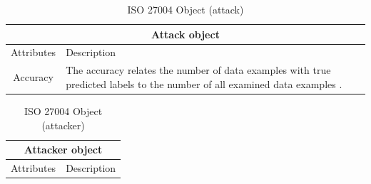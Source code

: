 \begin{table}[h]
\centering
  \begin{tabular}{|c|p{10cm}|}
  \hline
  \multicolumn{2}{|c|}{Attack object} \\
  \hline
  \rowcolor{lightgray} Attributes & Description \\ [0.5ex]
  \hline
  Accuracy & The accuracy relates the number of data examples with true predicted labels to the number of all examined data examples \cite{9783960101925}. \\
  \hline
  \end{tabular}
\caption{ISO 27004 Object (attack)}
\label{tab:attack}
\end{table}

\begin{table}[h]
\centering
  \begin{tabular}{| c | p{10cm} |}
  \hline
  \multicolumn{2}{|c|}{Attacker object} \\
  \hline
  \rowcolor{lightgray} Attributes & Description \\ [0.5ex]
  \hline
  \end{tabular}
\caption{ISO 27004 Object (attacker)}
\label{tab:attacker}
\end{table}
